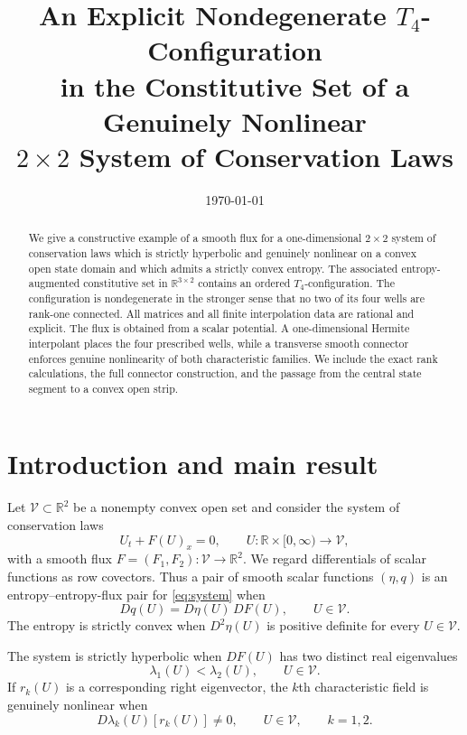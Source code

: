 \documentclass[11pt,reqno]{amsart}
\title[An explicit constitutive $T_4$-configuration]
{An Explicit Nondegenerate $T_4$-Configuration\\
in the Constitutive Set of a Genuinely Nonlinear\\
$2\times2$ System of Conservation Laws}
\date{\today}
\theoremstyle{definition}
\newcommand{\R}{\mathbb{R}}
\newcommand{\V}{\mathcal{V}}
\begin{document}
\begin{abstract}
We give a constructive example of a smooth flux for a one-dimensional
$2\times2$ system of conservation laws which is strictly hyperbolic and
genuinely nonlinear on a convex open state domain and which admits a strictly
convex entropy.  The associated entropy-augmented constitutive set in
$\R^{3\times2}$ contains an ordered $T_4$-configuration.  The configuration is
nondegenerate in the stronger sense that no two of its four wells are
rank-one connected.  All matrices and all finite interpolation data are
rational and explicit.  The flux is obtained from a scalar potential.  A
one-dimensional Hermite interpolant places the four prescribed wells, while
a transverse smooth connector enforces genuine nonlinearity of both
characteristic families.  We include the exact rank calculations, the full
connector construction, and the passage from the central state segment to a
convex open strip.
\end{abstract}

\maketitle

\section{Introduction and main result}

Let $\V\subset\R^2$ be a nonempty convex open set and consider the system of
conservation laws
\begin{equation}
  U_t+F(U)_x=0,
  \qquad U\colon\R\times[0,\infty)\longrightarrow\V,
  \label{eq:system}
\end{equation}
with a smooth flux $F=(F_1,F_2)\colon\V\to\R^2$.  We regard differentials of
scalar functions as row covectors.  Thus a pair of smooth scalar functions
$(\eta,q)$ is an entropy--entropy-flux pair for \cref{eq:system} when
\begin{equation}
  Dq(U)=D\eta(U)\,DF(U),
  \qquad U\in\V.
  \label{eq:entropy-compatibility}
\end{equation}
The entropy is strictly convex when $D^2\eta(U)$ is positive definite for
every $U\in\V$.

The system is strictly hyperbolic when $DF(U)$ has two distinct real
eigenvalues
\begin{equation}
  \lambda_1(U)<\lambda_2(U),
  \qquad U\in\V.
\end{equation}
If $r_k(U)$ is a corresponding right eigenvector, the $k$th characteristic
field is genuinely nonlinear when
\begin{equation}
  D\lambda_k(U)[r_k(U)]\neq0,
  \qquad U\in\V,\qquad k=1,2.
  \label{eq:genuine-nonlinearity}
\end{equation}
\end{document}
